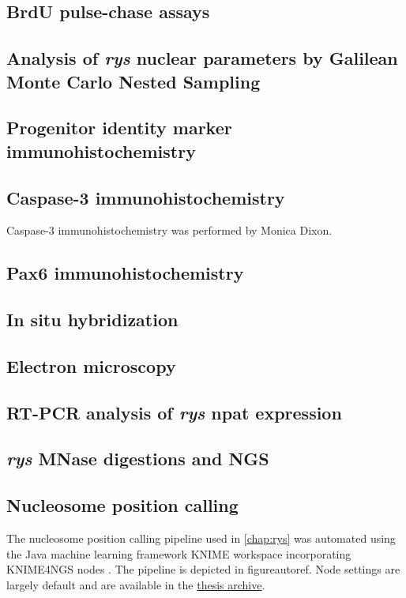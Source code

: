 \subsection{BrdU pulse-chase assays}

\subsection{Analysis of \textit{rys} nuclear parameters by Galilean Monte Carlo Nested Sampling}

\subsection{Progenitor identity marker immunohistochemistry}

\subsection{Caspase-3 immunohistochemistry}
Caspase-3 immunohistochemistry was performed by Monica Dixon. 

\subsection{Pax6 immunohistochemistry}


\subsection{In situ hybridization}


\subsection{Electron microscopy}


\subsection{RT-PCR analysis of \textit{rys} npat expression}

\subsection{\textit{rys} MNase digestions and NGS}

\subsection{Nucleosome position calling}
The nucleosome position calling pipeline used in \autoref{chap:rys} was automated using the Java machine learning framework KNIME \cite{Dietz2016} workspace incorporating KNIME4NGS nodes \cite{Hastreiter2017}. The pipeline is depicted in figureautoref. Node settings are largely default and are available in the  \hyperref[sec:archive]{thesis archive}.


